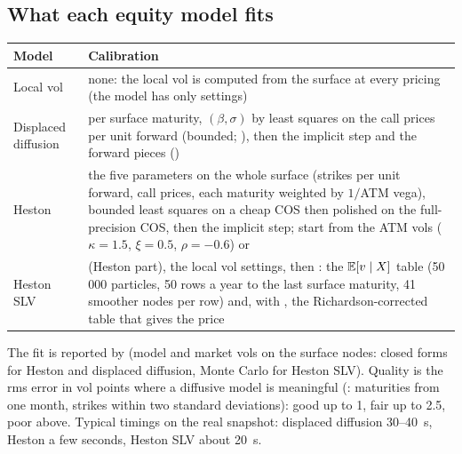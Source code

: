 \subsection{What each equity model fits}\label{sec:arch-equity-calibration}
\begin{center}
\small
\begin{tabular}{@{}L{3.1cm}L{12.1cm}@{}}
\toprule
Model & Calibration \\
\midrule
Local vol & none: the local vol is computed from the surface at every pricing (the model has only settings) \\
Displaced diffusion & per surface maturity, $(\beta, \sigma)$ by least squares on the call prices per unit forward
  (bounded; ), then the implicit step and the forward pieces () \\
Heston & the five parameters on the whole surface (strikes per unit forward, call prices, each maturity weighted by
  $1/$ATM vega), bounded least squares on a cheap COS then polished on the full-precision COS, then the implicit
  step; start from the ATM vols ($\kappa = 1.5$, $\xi = 0.5$, $\rho = -0.6$) or  \\
Heston SLV &  (Heston part), the local vol settings, then : the
  $\mathbb{E}[v \mid X]$ table (50\,000 particles, 50 rows a year to the last surface maturity, 41 smoother nodes per row)
  and, with , the Richardson-corrected table that gives the price \\
\bottomrule
\end{tabular}
\end{center}
The fit is reported by  (model and market vols on the surface nodes: closed forms for
Heston and displaced diffusion, Monte Carlo for Heston SLV). Quality is the rms error in vol points where a diffusive
model is meaningful (: maturities from one month, strikes within two standard deviations): good up
to 1, fair up to 2.5, poor above. Typical timings on the real snapshot: displaced diffusion 30--40~s, Heston a few
seconds, Heston SLV about 20~s.

